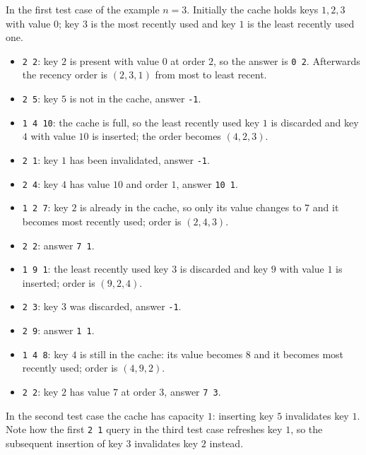 In the first test case of the example $n = 3$. Initially the cache holds keys $1, 2, 3$ with value $0$; key $3$ is the most recently used and key $1$ is the least recently used one.

\begin{itemize}
  \item \texttt{2 2}: key $2$ is present with value $0$ at order $2$, so the answer is \texttt{0 2}. Afterwards the recency order is $(2, 3, 1)$ from most to least recent.
  \item \texttt{2 5}: key $5$ is not in the cache, answer \texttt{-1}.
  \item \texttt{1 4 10}: the cache is full, so the least recently used key $1$ is discarded and key $4$ with value $10$ is inserted; the order becomes $(4, 2, 3)$.
  \item \texttt{2 1}: key $1$ has been invalidated, answer \texttt{-1}.
  \item \texttt{2 4}: key $4$ has value $10$ and order $1$, answer \texttt{10 1}.
  \item \texttt{1 2 7}: key $2$ is already in the cache, so only its value changes to $7$ and it becomes most recently used; order is $(2, 4, 3)$.
  \item \texttt{2 2}: answer \texttt{7 1}.
  \item \texttt{1 9 1}: the least recently used key $3$ is discarded and key $9$ with value $1$ is inserted; order is $(9, 2, 4)$.
  \item \texttt{2 3}: key $3$ was discarded, answer \texttt{-1}.
  \item \texttt{2 9}: answer \texttt{1 1}.
  \item \texttt{1 4 8}: key $4$ is still in the cache: its value becomes $8$ and it becomes most recently used; order is $(4, 9, 2)$.
  \item \texttt{2 2}: key $2$ has value $7$ at order $3$, answer \texttt{7 3}.
\end{itemize}

In the second test case the cache has capacity $1$: inserting key $5$ invalidates key $1$. Note how the first \texttt{2 1} query in the third test case refreshes key $1$, so the subsequent insertion of key $3$ invalidates key $2$ instead.
